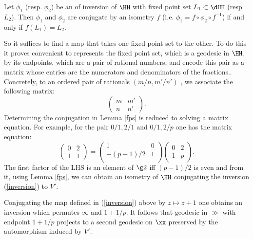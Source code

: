 \begin{lem}\label{fps}
Let $\phi_1$ (resp. $\phi_2$)
 be an of inversion of $\HH$ with fixed point set
  $L_1  \subset \dHH$ (resp $L_2$).
Then $\phi_1$ and $\phi_2$
  are conjugate by an isometry  $f$ 
  (i.e. $\phi_1 = f\circ \phi_2 \circ f^{-1}$)
  if and only if $ f(L_1) = L_2.$
\end{lem} 
So it suffices to find a  map that takes one fixed point set to the other.
To do this it proves convenient to represents the fixed point set, 
which is a geodesic in $\HH$,
by its endpoints, which are a pair of rational numbers,
and encode this pair as a matrix 
whose entries are  the numerators and denominators of the fractions..
Concretely, to an ordered  pair of rationals  $(m/n, m'/n')$ , 
 we associate the following matrix:
$$\begin{pmatrix}
m & m'\\
n & n'
\end{pmatrix}.
$$
Determining the  conjugation in Lemma \ref{fps}
is reduced to solving a matrix equation.
For example, for the pair $0/1, 2/1$  and  $0/1, 2/p$   one has the matrix equation:
\begin{equation}
\begin{pmatrix}
0 & 2\\
1 & 1
\end{pmatrix}
= 
\begin{pmatrix}
1 & 0 \\
 -(p-1)/2& 1\\
\end{pmatrix}
\begin{pmatrix}
0& 2\\
1 & p
\end{pmatrix}.
\end{equation}
The first factor of the LHS is an element of $\g2$ iff $(p-1)/2$ is even
 and from it, using Lemma \ref{fps}, we can obtain an isometry of
$\HH$ conjugating the inversion (\ref{inversion}) to $V'$.

Conjugating the map defined in (\ref{inversion}) above
by $z \mapsto z + 1$ 
one obtains an inversion 
which permutes $\infty$ and  $1 + 1/p$.
It follows that  geodesic in $\gg$ with endpoint $1 + 1/p$ 
projects to a second geodesic on $\xx$
preserved by the automorphism induced by $V'$.



